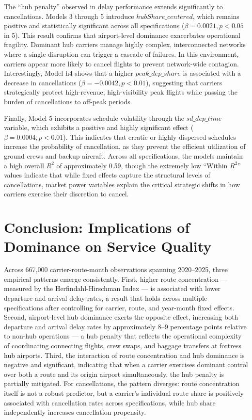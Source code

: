 \documentclass[preprint,12pt,authoryear]{elsarticle}
\begin{document}
The ``hub penalty'' observed in delay performance extends significantly to cancellations. Models 3 through 5 introduce $hubShare\_centered$, which remains positive and statistically significant across all specifications ($\beta = 0.0021, p < 0.05$ in 5). This result confirms that airport-level dominance exacerbates operational fragility. Dominant hub carriers manage highly complex, interconnected networks where a single disruption can trigger a cascade of failures. In this environment, carriers appear more likely to cancel flights to prevent network-wide contagion. Interestingly, Model h4 shows that a higher $peak\_dep\_share$ is associated with a decrease in cancellations ($\beta = -0.0042, p < 0.01$), suggesting that carriers strategically protect high-revenue, high-visibility peak flights while passing the burden of cancellations to off-peak periods.


Finally, Model 5 incorporates schedule volatility through the $sd\_dep\_time$ variable, which exhibits a positive and highly significant effect ($\beta = 0.0004, p < 0.01$). This indicates that erratic or highly dispersed schedules increase the probability of cancellation, as they prevent the efficient utilization of ground crews and backup aircraft. Across all specifications, the models maintain a high overall $R^2$ of approximately 0.59, though the extremely low ``Within $R^2$'' values indicate that while fixed effects capture the structural levels of cancellations, market power variables explain the critical strategic shifts in how carriers exercise their discretion to cancel.

\section{Conclusion: Implications of Dominance on Service Quality}
Across 667,000 carrier-route-month observations spanning 2020–2025, three empirical patterns emerge consistently. First, higher route concentration — measured by the Herfindahl-Hirschman Index — is associated with lower departure and arrival delay rates, a result that holds across multiple specifications after controlling for carrier, route, and year-month fixed effects. Second, airport-level hub dominance exerts the opposite effect, increasing both departure and arrival delay rates by approximately 8–9 percentage points relative to non-hub operations — a hub penalty that reflects the operational complexity of coordinating connecting flights, crew swaps, and baggage transfers at fortress hub airports. Third, the interaction of route concentration and hub dominance is negative and significant, indicating that when a carrier exercises dominant control over both a route and its origin airport simultaneously, the hub penalty is partially mitigated. For cancellations, the pattern diverges: route concentration itself is not a robust predictor, but a carrier's individual route share is positively associated with cancellation rates across specifications, while hub share independently increases cancellation propensity.
\end{document}
